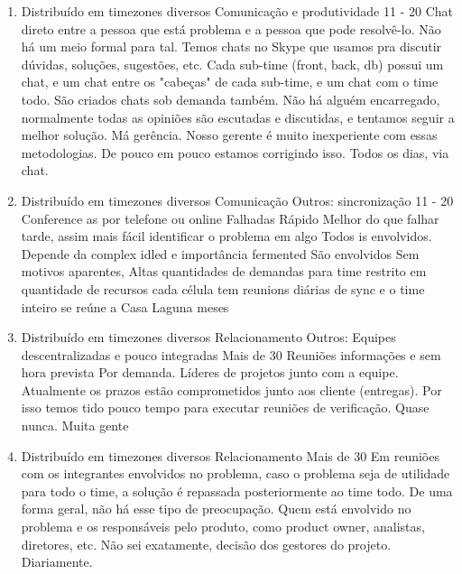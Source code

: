 \begin{enumerate}[leftmargin=0.5em]
	\item
	\begin{respostas3}
		{Distribuído em timezones diversos}
		{Comunicação e produtividade}
		{11 - 20}
		{Chat direto entre a pessoa que está problema e a pessoa que pode resolvê-lo.}
		{Não há um meio formal para tal. Temos chats no Skype que usamos pra discutir dúvidas, soluções, sugestões, etc. Cada sub-time (front, back, db) possui um chat, e um chat entre os "cabeças" de cada sub-time, e um chat com o time todo. São criados chats sob demanda também.}
		{Não há alguém encarregado, normalmente todas as opiniões são escutadas e discutidas, e tentamos seguir a melhor solução.}
		{Má gerência. Nosso gerente é muito inexperiente com essas metodologias. De pouco em pouco estamos corrigindo isso.}
		{Todos os dias, via chat.}
	\end{respostas3}

	\item
	\begin{respostas3}
		{Distribuído em timezones diversos}
		{Comunicação \newline Outros: sincronização}
		{11 - 20}
		{Conference as por telefone ou online}
		{Falhadas Rápido Melhor do que falhar tarde, assim mais fácil identificar o problema em algo}
		{Todos is envolvidos. Depende da complex idled e importância fermented São envolvidos}
		{Sem motivos aparentes, Altas quantidades de demandas para time restrito em quantidade de recursos}
		{cada célula tem reunions diárias de sync e o time inteiro se reúne a Casa Laguna meses}
	\end{respostas3}

	\item
	\begin{respostas3}
		{Distribuído em timezones diversos}
		{Relacionamento \newline Outros: Equipes descentralizadas e pouco integradas}
		{Mais de 30}
		{Reuniões informações e sem hora prevista}
		{Por demanda.}
		{Líderes de projetos junto com a equipe.}
		{Atualmente os prazos estão comprometidos junto aos cliente (entregas). Por isso temos tido pouco tempo para executar reuniões de verificação.}
		{Quase nunca. Muita gente}
	\end{respostas3}

	\item
	\begin{respostas3}
		{Distribuído em timezones diversos}
		{Relacionamento}
		{Mais de 30}
		{Em reuniões com os integrantes envolvidos no problema, caso o problema seja de utilidade para todo o time, a solução é repassada posteriormente ao time todo.}
		{De uma forma geral, não há esse tipo de preocupação.}
		{Quem está envolvido no problema e os responsáveis pelo produto, como product owner, analistas, diretores, etc.}
		{Não sei exatamente, decisão dos gestores do projeto.}
		{Diariamente.}
	\end{respostas3}


\end{enumerate}

